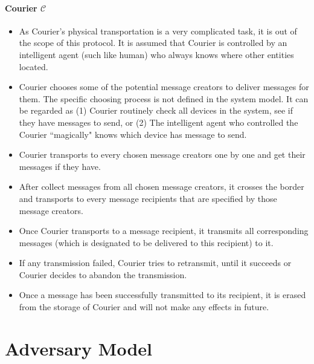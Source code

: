 \paragraph{Courier $\mathcal{C}$}
\begin{itemize}
\item As Courier's physical transportation is a very complicated task, it is out of the scope of this protocol. It is assumed that Courier is controlled by an intelligent agent (such like human) who always knows where other entities located.

\item Courier chooses some of the potential message creators to deliver messages for them. The specific choosing process is not defined in the system model. It can be regarded as (1) Courier routinely check all devices in the system, see if they have messages to send, or (2) The intelligent agent who controlled the Courier ``magically" knows which device has message to send.

\item Courier transports to every chosen message creators one by one and get their messages if they have.

\item After collect messages from all chosen message creators, it crosses the border and transports to every message recipients that are specified by those message creators.

\item Once Courier transports to a message recipient, it transmits all corresponding messages (which is designated to be delivered to this recipient) to it.

\item If any transmission failed, Courier tries to retransmit, until it succeeds or Courier decides to abandon the transmission.

\item Once a message has been successfully transmitted to its recipient, it is erased from the storage of Courier and will not make any effects in future.
\end{itemize}

\section{Adversary Model}
